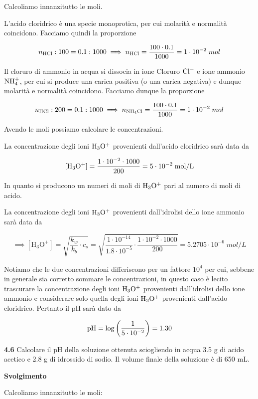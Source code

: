 Calcoliamo innanzitutto le moli.

L'acido cloridrico è una specie monoprotica, per cui molarità e normalità coincidono. Facciamo quindi la proporzione

$$n_{\rm HCl}:100=0.1:1000
\implies
n_{\rm HCl}=\frac{100 \cdot 0.1}{1000}=1 \cdot 10^{-2}\;mol$$

Il cloruro di ammonio in acqua si dissocia in ione Cloruro $\rm Cl^-$ e ione ammonio $\rm NH_4^+$, per cui si produce una carica positiva (o una carica negativa) e dunque molarità e normalità coincidono. Facciamo dunque la proporzione

$$n_{\rm HCl}:200=0.1:1000
\implies
n_{\rm NH_4Cl}=\frac{100 \cdot 0.1}{1000}=1 \cdot 10^{-2}\;mol$$

Avendo le moli possiamo calcolare le concentrazioni.

La concentrazione degli ioni $\rm H_3O^+$ provenienti dall'acido cloridrico sarà data da

$$[\rm H_3O^+]=\frac{1 \cdot 10^{-2} \cdot 1000}{200}=5 \cdot 10^{-2}\;mol/L$$

In quanto si producono un numeri di moli di $\rm H_3O^+$ pari al numero di moli di acido.

La concentrazione degli ioni $\rm H_3O^+$ provenienti dall'idrolisi dello ione ammonio sarà data da

$$\implies [\text{H}_3\text{O}^+]=\sqrt{\frac{k_w}{k_b} \cdot c_s}=\sqrt{\frac{1 \cdot 10^{-14}}{1.8 \cdot 10^{-5}} \cdot \frac{1 \cdot 10^{-2} \cdot 1000}{200}}=5.2705 \cdot 10^{-6}\;mol/L$$

Notiamo che le due concentrazioni differiscono per un fattore $10^4$ per cui, sebbene in generale sia corretto sommare le concentrazioni, in questo caso è lecito trascurare la concentrazione degli ioni $\rm H_3O^+$ provenienti dall'idrolisi dello ione ammonio e considerare solo quella degli ioni $\rm H_3O^+$ provenienti dall'acido cloridrico. Pertanto il pH sarà dato da

$$\rm pH=\log\left(\frac{1}{5 \cdot 10^{-2}}\right)=1.30$$

\vspace{0.2cm}\textbf{4.6} Calcolare il pH della soluzione ottenuta sciogliendo in acqua 3.5 g di acido acetico e 2.8 g di idrossido di sodio. Il volume finale della soluzione è di 650 mL.

\vspace{0.2cm}\large\textbf{Svolgimento}\normalsize

\vspace{0.2cm}Calcoliamo innanzitutto le moli:


